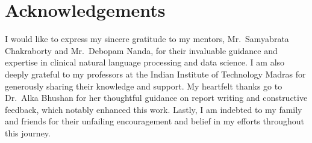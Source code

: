 \chapter*{Acknowledgements}
\begin{doublespacing}
I would like to express my sincere gratitude to my mentors, Mr.~Samyabrata Chakraborty and Mr.~Debopam Nanda, for their invaluable guidance and expertise in clinical natural language processing and data science. I am also deeply grateful to my professors at the Indian Institute of Technology Madras for generously sharing their knowledge and support. My heartfelt thanks go to Dr.~Alka Bhushan for her thoughtful guidance on report writing and constructive feedback, which notably enhanced this work. Lastly, I am indebted to my family and friends for their unfailing encouragement and belief in my efforts throughout this journey.
\end{doublespacing}
